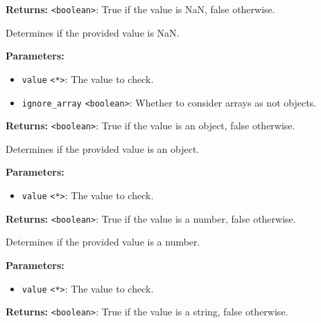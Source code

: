 \documentclass[12pt,a4paper]{article}
\begin{document}
\noindent \textbf{Returns:} \texttt{<boolean>}: True if the value is NaN, false otherwise.

\noindent Determines if the provided value is NaN.

\vspace{5mm}
\noindent {}


\noindent \textbf{Parameters:}
\begin{itemize}
  \item \texttt{value} \texttt{<*>}: The value to check.
  \item \texttt{ignore\_array} \texttt{<boolean>}: Whether to consider arrays as not objects.
\end{itemize}

\noindent \textbf{Returns:} \texttt{<boolean>}: True if the value is an object, false otherwise.

\noindent Determines if the provided value is an object.

\vspace{5mm}
\noindent {}


\noindent \textbf{Parameters:}
\begin{itemize}
  \item \texttt{value} \texttt{<*>}: The value to check.
\end{itemize}

\noindent \textbf{Returns:} \texttt{<boolean>}: True if the value is a number, false otherwise.

\noindent Determines if the provided value is a number.

\vspace{5mm}
\noindent {}


\noindent \textbf{Parameters:}
\begin{itemize}
  \item \texttt{value} \texttt{<*>}: The value to check.
\end{itemize}

\noindent \textbf{Returns:} \texttt{<boolean>}: True if the value is a string, false otherwise.
\end{document}
